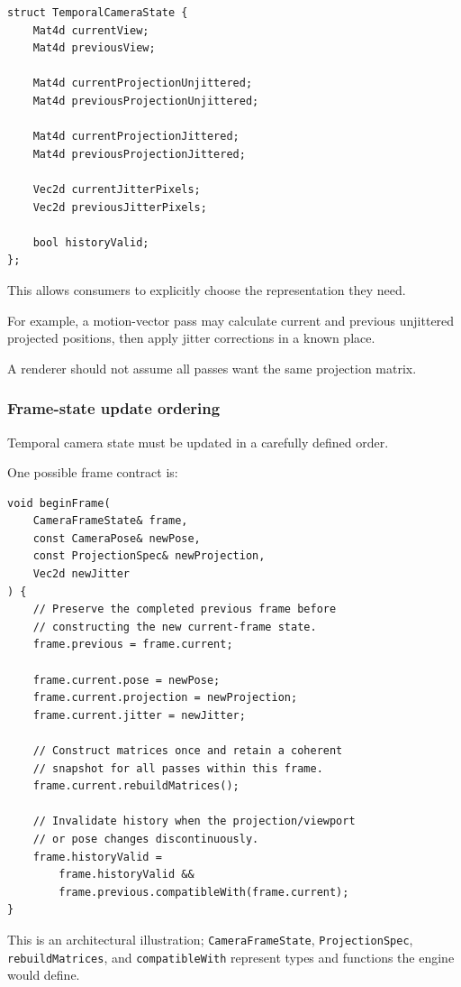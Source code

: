 \begin{verbatim}
struct TemporalCameraState {
    Mat4d currentView;
    Mat4d previousView;

    Mat4d currentProjectionUnjittered;
    Mat4d previousProjectionUnjittered;

    Mat4d currentProjectionJittered;
    Mat4d previousProjectionJittered;

    Vec2d currentJitterPixels;
    Vec2d previousJitterPixels;

    bool historyValid;
};
\end{verbatim}

This allows consumers to explicitly choose the representation they need.

For example, a motion-vector pass may calculate current and previous unjittered projected positions, then apply jitter corrections in a known place.

A renderer should not assume all passes want the same projection matrix.

\subsubsection{Frame-state update ordering}\label{frame-state-update-ordering}

Temporal camera state must be updated in a carefully defined order.

One possible frame contract is:

\begin{verbatim}
void beginFrame(
    CameraFrameState& frame,
    const CameraPose& newPose,
    const ProjectionSpec& newProjection,
    Vec2d newJitter
) {
    // Preserve the completed previous frame before
    // constructing the new current-frame state.
    frame.previous = frame.current;

    frame.current.pose = newPose;
    frame.current.projection = newProjection;
    frame.current.jitter = newJitter;

    // Construct matrices once and retain a coherent
    // snapshot for all passes within this frame.
    frame.current.rebuildMatrices();

    // Invalidate history when the projection/viewport
    // or pose changes discontinuously.
    frame.historyValid =
        frame.historyValid &&
        frame.previous.compatibleWith(frame.current);
}
\end{verbatim}

This is an architectural illustration; \texttt{CameraFrameState}, \texttt{ProjectionSpec}, \texttt{rebuildMatrices}, and \texttt{compatibleWith} represent types and functions the engine would define.

